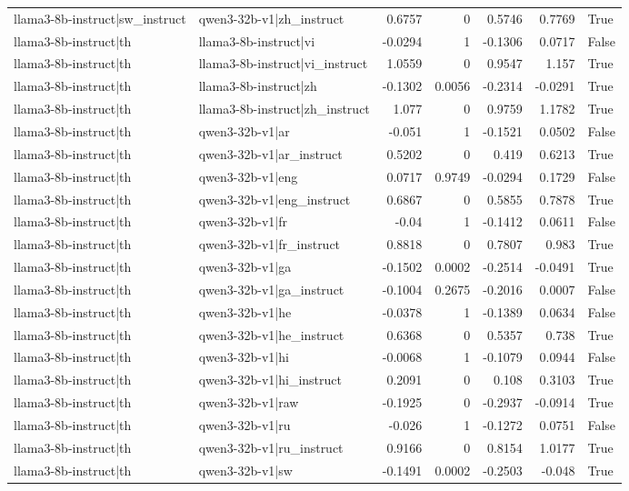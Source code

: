 \begin{table}
\begin{tabular}{l l r r r r l}
llama3-8b-instruct|sw_instruct & qwen3-32b-v1|zh_instruct & 0.6757 & 0 & 0.5746 & 0.7769 & True \\
llama3-8b-instruct|th & llama3-8b-instruct|vi & -0.0294 & 1 & -0.1306 & 0.0717 & False \\
llama3-8b-instruct|th & llama3-8b-instruct|vi_instruct & 1.0559 & 0 & 0.9547 & 1.157 & True \\
llama3-8b-instruct|th & llama3-8b-instruct|zh & -0.1302 & 0.0056 & -0.2314 & -0.0291 & True \\
llama3-8b-instruct|th & llama3-8b-instruct|zh_instruct & 1.077 & 0 & 0.9759 & 1.1782 & True \\
llama3-8b-instruct|th & qwen3-32b-v1|ar & -0.051 & 1 & -0.1521 & 0.0502 & False \\
llama3-8b-instruct|th & qwen3-32b-v1|ar_instruct & 0.5202 & 0 & 0.419 & 0.6213 & True \\
llama3-8b-instruct|th & qwen3-32b-v1|eng & 0.0717 & 0.9749 & -0.0294 & 0.1729 & False \\
llama3-8b-instruct|th & qwen3-32b-v1|eng_instruct & 0.6867 & 0 & 0.5855 & 0.7878 & True \\
llama3-8b-instruct|th & qwen3-32b-v1|fr & -0.04 & 1 & -0.1412 & 0.0611 & False \\
llama3-8b-instruct|th & qwen3-32b-v1|fr_instruct & 0.8818 & 0 & 0.7807 & 0.983 & True \\
llama3-8b-instruct|th & qwen3-32b-v1|ga & -0.1502 & 0.0002 & -0.2514 & -0.0491 & True \\
llama3-8b-instruct|th & qwen3-32b-v1|ga_instruct & -0.1004 & 0.2675 & -0.2016 & 0.0007 & False \\
llama3-8b-instruct|th & qwen3-32b-v1|he & -0.0378 & 1 & -0.1389 & 0.0634 & False \\
llama3-8b-instruct|th & qwen3-32b-v1|he_instruct & 0.6368 & 0 & 0.5357 & 0.738 & True \\
llama3-8b-instruct|th & qwen3-32b-v1|hi & -0.0068 & 1 & -0.1079 & 0.0944 & False \\
llama3-8b-instruct|th & qwen3-32b-v1|hi_instruct & 0.2091 & 0 & 0.108 & 0.3103 & True \\
llama3-8b-instruct|th & qwen3-32b-v1|raw & -0.1925 & 0 & -0.2937 & -0.0914 & True \\
llama3-8b-instruct|th & qwen3-32b-v1|ru & -0.026 & 1 & -0.1272 & 0.0751 & False \\
llama3-8b-instruct|th & qwen3-32b-v1|ru_instruct & 0.9166 & 0 & 0.8154 & 1.0177 & True \\
llama3-8b-instruct|th & qwen3-32b-v1|sw & -0.1491 & 0.0002 & -0.2503 & -0.048 & True \\

\end{tabular}
\end{table}
